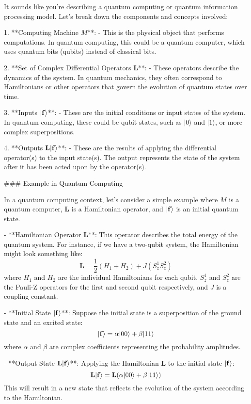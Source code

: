 It sounds like you're describing a quantum computing or quantum information processing model. Let's break down the components and concepts involved:

1. **Computing Machine \( M \)**:
   - This is the physical object that performs computations. In quantum computing, this could be a quantum computer, which uses quantum bits (qubits) instead of classical bits.

2. **Set of Complex Differential Operators \( \mathbf{L} \)**:
   - These operators describe the dynamics of the system. In quantum mechanics, they often correspond to Hamiltonians or other operators that govern the evolution of quantum states over time.

3. **Inputs \( |{\bf f}\rangle \)**:
   - These are the initial conditions or input states of the system. In quantum computing, these could be qubit states, such as \( |0\rangle \) and \( |1\rangle \), or more complex superpositions.

4. **Outputs \( \mathbf{L}|{\bf f}\rangle \)**:
   - These are the results of applying the differential operator(s) to the input state(s). The output represents the state of the system after it has been acted upon by the operator(s).

### Example in Quantum Computing

In a quantum computing context, let's consider a simple example where \( M \) is a quantum computer, \( \mathbf{L} \) is a Hamiltonian operator, and \( |{\bf f}\rangle \) is an initial quantum state.

- **Hamiltonian Operator \( \mathbf{L} \)**: This operator describes the total energy of the quantum system. For instance, if we have a two-qubit system, the Hamiltonian might look something like:
  \[
  \mathbf{L} = \frac{1}{2}(H_1 + H_2) + J(S_z^1 S_z^2)
  \]
  where \( H_1 \) and \( H_2 \) are the individual Hamiltonians for each qubit, \( S_z^1 \) and \( S_z^2 \) are the Pauli-Z operators for the first and second qubit respectively, and \( J \) is a coupling constant.

- **Initial State \( |{\bf f}\rangle \)**: Suppose the initial state is a superposition of the ground state and an excited state:
  \[
  |{\bf f}\rangle = \alpha |00\rangle + \beta |11\rangle
  \]
  where \( \alpha \) and \( \beta \) are complex coefficients representing the probability amplitudes.

- **Output State \( \mathbf{L}|{\bf f}\rangle \)**: Applying the Hamiltonian \( \mathbf{L} \) to the initial state \( |{\bf f}\rangle \):
  \[
  \mathbf{L}|{\bf f}\rangle = \mathbf{L}(\alpha |00\rangle + \beta |11\rangle)
  \]
  This will result in a new state that reflects the evolution of the system according to the Hamiltonian.

